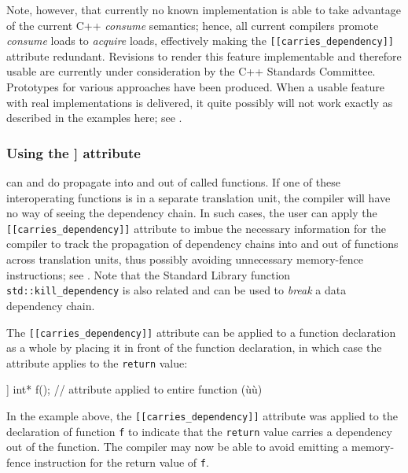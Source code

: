 Note, however, that currently no known implementation is able to take
advantage of the current C++ \emph{consume} semantics; hence, all
current compilers promote \emph{consume} loads to \emph{acquire} loads,
effectively making the \lstinline![[carries_dependency]]! attribute
redundant. Revisions to render this feature implementable and therefore
usable are currently under consideration by the C++ Standards Committee.
Prototypes for various approaches have been produced. When a usable
feature with real implementations is delivered, it quite possibly will
not work exactly as described in the examples here; see .

\subsubsection[Using the {\protect\lstinline![[carries_dependency]]!} attribute]{Using the {\SubsubsecCode [[carries\_dependency]]} attribute}\label{using-the-[[carries_dependency]]-attribute}

 can and do propagate into and out of
called functions. If one of these interoperating functions is in a
separate translation unit, the compiler will have no way of seeing the
dependency chain. In such cases, the user can apply the
\lstinline![[carries_dependency]]! attribute to imbue the necessary
information for the compiler to track the propagation of dependency
chains into and out of functions across translation units, thus possibly
avoiding unnecessary memory-fence instructions; see . Note that the Standard Library function
\lstinline!std::kill_dependency! is also related and can be used to
  \emph{break} a data dependency chain.

The \lstinline![[carries_dependency]]! attribute can be applied to a
function declaration as a whole by placing it in front of the function declaration,
in which case the attribute applies to the \lstinline!return! value:

\begin{emcppslisting}
[[carries_dependency]] int* f();  // attribute applied to entire function (ù{}ù)
\end{emcppslisting}

\noindent In the example above, the \lstinline![[carries_dependency]]! attribute was
applied to the declaration of function \lstinline!f! to indicate that the
\lstinline!return! value carries a dependency out of the function. The
compiler may now be able to avoid emitting a memory-fence instruction
for the return value of \lstinline!f!.

